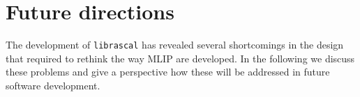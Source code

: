 



\section{Future directions}
The development of \texttt{librascal} has revealed several shortcomings in the design that required to rethink the way MLIP are developed.
In the following we discuss these problems and give a perspective how these will be addressed in future software development.

